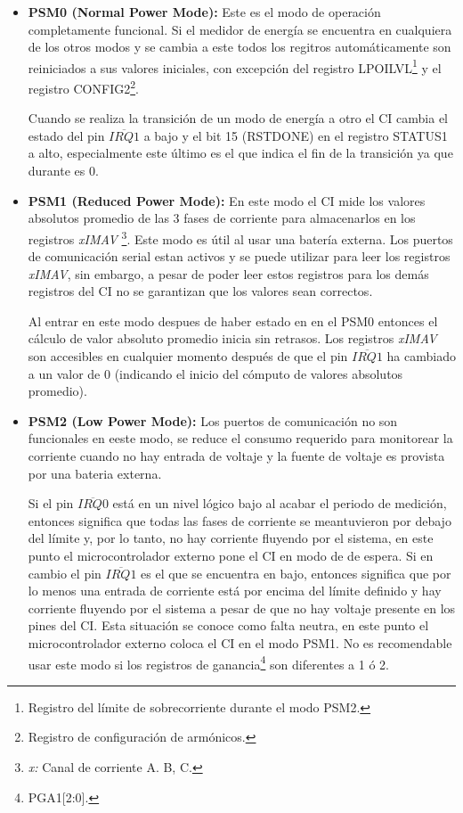 \documentclass[letterpaper,12pt,oneside]{book}
\begin{document}
			\begin{itemize}
				\item \textbf{PSM0 (Normal Power Mode):} Este es el modo de operación completamente funcional.
				Si el medidor de energía se encuentra en cualquiera de los otros modos y se cambia a este todos los regitros automáticamente son reiniciados a sus valores iniciales, con excepción del registro LPOILVL\footnote{Registro del límite de sobrecorriente durante el modo PSM2.} y el registro CONFIG2\footnote{Registro de configuración de armónicos.}.

				Cuando se realiza la transición de un modo de energía a otro el CI cambia el estado del pin $\overline{IRQ1}$ a bajo y el bit 15 (RSTDONE) en el registro STATUS1 a alto, especialmente este último es el que indica el fin de la transición ya que durante es 0.

				\item \textbf{PSM1 (Reduced Power Mode):} En este modo el CI mide los valores absolutos promedio de las 3 fases de corriente para almacenarlos en los registros \textit{xIMAV} \footnote{\textit{x:} Canal de corriente  A. B, C.}. 
				Este modo es útil al usar una batería externa. Los puertos de comunicación serial estan activos y se puede utilizar para leer los registros \textit{xIMAV}, sin embargo, a pesar de poder leer estos registros para los demás registros del CI no se garantizan que los valores sean correctos.

				Al entrar en este modo despues de haber estado en en el PSM0 entonces el cálculo de valor absoluto promedio inicia sin retrasos. Los registros \textit{xIMAV} son accesibles en cualquier momento después de que el pin $\overline{IRQ1}$ ha cambiado a un valor de 0 (indicando el inicio del cómputo de valores absolutos promedio).

				\item \textbf{PSM2 (Low Power Mode):} Los puertos de comunicación no son funcionales en eeste modo, se reduce el consumo requerido para monitorear la corriente cuando no hay entrada de voltaje y la fuente de voltaje es provista por una bateria externa.

				Si el pin $\overline{IRQ0}$ está en un nivel lógico bajo al acabar el periodo de medición, entonces significa que todas las fases de corriente se meantuvieron por debajo del límite y, por lo tanto, no hay corriente fluyendo por el sistema, en este punto el microcontrolador externo pone el CI en modo de de espera. Si en cambio el pin $\overline{IRQ1}$ es el que se encuentra en bajo, entonces significa que por lo menos una entrada de corriente está por encima del límite definido y hay corriente fluyendo por el sistema a pesar de que no hay voltaje presente en los pines del CI. Esta situación se conoce como falta neutra, en este punto el microcontrolador externo coloca el CI en el modo PSM1. No es recomendable usar este modo si los registros de ganancia\footnote{PGA1[2:0].} son diferentes a 1 ó 2.


\end{itemize}
\end{document}
